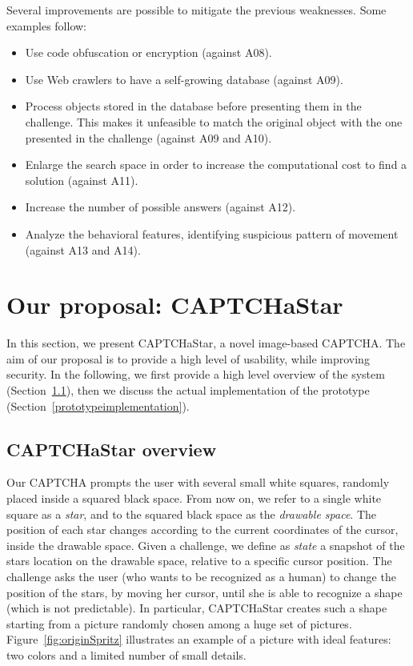 \documentclass[conference]{IEEEtran}
\begin{document}
Several improvements are possible to mitigate the previous weaknesses. Some examples follow: \begin{itemize} \item Use code obfuscation or encryption (against A08). \item Use Web crawlers to have a self-growing database (against A09). \item Process objects stored in the database before presenting them in the challenge. 
  This makes it unfeasible to match the original object with the one presented in the challenge (against A09 and A10). \item Enlarge the search space in order to increase the computational cost to find a solution (against A11). \item Increase the number of possible answers (against A12). \item Analyze the behavioral features, identifying suspicious pattern of movement~\cite{mohamed2014dynamic} (against A13 and A14). \end{itemize}
\section{Our proposal: CAPTCHaStar}
\label{ourproposed}
In this section, we present CAPTCHaStar, a novel image-based CAPTCHA.
The aim of our proposal is to provide a high level of usability, while improving security.
In the following, we first provide a high level overview of the system (Section~\ref{captchastaroverview}), then we discuss the actual implementation of the prototype (Section~\ref{prototypeimplementation}).

\subsection{CAPTCHaStar overview}
\label{captchastaroverview}
Our CAPTCHA prompts the user with several small white squares, randomly placed inside a squared black space.
From now on, we refer to a single white square as a \textit{star}, and to the squared black space as the \textit{drawable space}.
The position of each star
changes according to
the current coordinates of the cursor, inside the drawable space.
Given a challenge, we define as \textit{state} a snapshot of the stars location on the drawable space, relative to a specific cursor position.
The challenge asks the user
(who wants to be recognized as a human)
to change the position of the stars,
by moving her cursor, until she is able to recognize a shape (which is not predictable).
In particular, CAPTCHaStar creates such a shape starting from a picture randomly chosen among a huge set of pictures.
Figure~\ref{fig:originSpritz} illustrates an example of a picture with ideal features: two colors and a limited number of small details.
\end{document}
